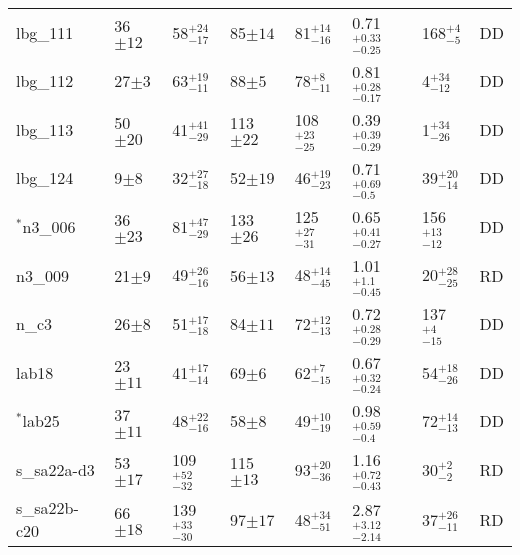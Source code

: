 \documentclass[fleqn,usenatbib]{mnras}
\begin{document}
\begin{table*}
\begin{threeparttable}
\begin{tabular}{llllllll}
lbg\_111        & 36$\pm12$         & 58$^{+24}_{-17}$                     & 85$\pm14$                  & 81$^{+14}_{-16}$                   & 0.71$^{+0.33}_{-0.25}$                 & 168$^{+4}_{-5}$ & DD  \\[1ex]
lbg\_112         & 27$\pm3$                    & 63$^{+19}_{-11}$                    & 88$\pm5$                 & 78$^{+8}_{-11}$       & 0.81$^{+0.28}_{-0.17}$               & 4$^{+34}_{-12}$ & DD \\[1ex]
lbg\_113        & 50$\pm20$           & 41$^{+41}_{-29}$                     & 113$\pm22$                 & 108$^{+23}_{-25}$                  & 0.39$^{+0.39}_{-0.29}$                & 1$^{+34}_{-26}$  & DD   \\[1ex]
lbg\_124         & 9$\pm8$                    & 32$^{+27}_{-18}$                    & 52$\pm19$                 & 46$^{+19}_{-23}$       & 0.71$^{+0.69}_{-0.5}$               & 39$^{+20}_{-14}$ & DD \\[1ex]
$^{*}$n3\_006         & 36$\pm23$                    & 81$^{+47}_{-29}$                     & 133$\pm26$                 & 125$^{+27}_{-31}$          & 0.65$^{+0.41}_{-0.27}$                & 156$^{+13}_{-12}$ & DD   \\[1ex]
n3\_009         & 21$\pm9$                    & 49$^{+26}_{-16}$                     & 56$\pm13$                  & 48$^{+14}_{-45}$          & 1.01$^{+1.1}_{-0.45}$                & 20$^{+28}_{-25}$  & RD   \\[1ex]
n\_c3           & 26$\pm8$                    & 51$^{+17}_{-18}$                     & 84$\pm11$                  & 72$^{+12}_{-13}$          & 0.72$^{+0.28}_{-0.29}$                & 137$^{+4}_{-15}$  & DD  \\[1ex]
lab18           & 23$\pm11$                   & 41$^{+17}_{-14}$                     & 69$\pm6$                  & 62$^{+7}_{-15}$           & 0.67$^{+0.32}_{-0.24}$                 & 54$^{+18}_{-26}$ & DD    \\[1ex]
$^{*}$lab25           & 37$\pm11$                    & 48$^{+22}_{-16}$                     & 58$\pm8$                  & 49$^{+10}_{-19}$          & 0.98$^{+0.59}_{-0.4}$                & 72$^{+14}_{-13}$ & DD   \\[1ex]
s\_sa22a-d3     & 53$\pm17$                    & 109$^{+52}_{-32}$                    & 115$\pm13$                 & 93$^{+20}_{-36}$          & 1.16$^{+0.72}_{-0.43}$               & 30$^{+2}_{-2}$ & RD    \\[1ex]
s\_sa22b-c20    & 66$\pm18$                    & 139$^{+33}_{-30}$                    & 97$\pm17$                 & 48$^{+34}_{-51}$          & 2.87$^{+3.12}_{-2.14}$                & 37$^{+26}_{-11}$ & RD   \\[1ex]

\end{tabular}
\end{threeparttable}
\end{table*}
\end{document}
